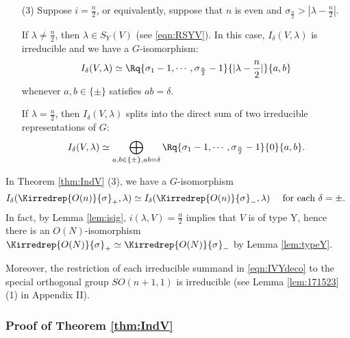 \begin{theorem}
\begin{enumerate}
\item[{\rm{(3)}}]
Suppose $i=\frac n 2$, 
 or equivalently, 
 suppose that $n$ is even and $\sigma_{\frac n 2} >|\lambda-\frac n 2|$.  



If $\lambda \ne \frac n 2$, 
then $\lambda \in S_Y(V)$
 (see \eqref{eqn:RSYV}).  
In this case,
 $I_{\delta}(V, \lambda)$ is irreducible
 and we have a $G$-isomorphism:
\[I_{\delta}(V, \lambda)
    \simeq 
\Rq{\sigma_1-1, \cdots, \sigma_{\frac n 2}-1}{|\lambda-\frac n2|}{a, b}
\]
whenever $a,b \in \{\pm\}$ satisfies $a b = \delta$.  



If $\lambda = \frac n 2$,
 then $I_{\delta}(V, \lambda)$ splits
 into the direct sum of two irreducible representations of $G$:
\begin{equation}
\label{eqn:IVYdeco}
I_{\delta}(V, \lambda)
    \simeq 
\bigoplus_{a,b \in \{\pm\}, ab =\delta}
\Rq{\sigma_1-1, \cdots, \sigma_{\frac n 2}-1}{0}{a, b}.  
\end{equation}
\end{enumerate}
\end{theorem}



\begin{remark}
\label{rem:IVlisom}
In Theorem \ref{thm:IndV} (3), 
 we have a $G$-isomorphism 
\[
   I_{\delta}({\Kirredrep{O(n)}{\sigma}}_+, \lambda)
   \simeq
   I_{\delta}({\Kirredrep{O(n)}{\sigma}}_-, \lambda)
\quad
\text{ for each $\delta= \pm$.  }
\]
In fact,
 by Lemma \ref{lem:isig}, 
 $i(\lambda,V)=\frac n 2$ implies 
 that $V$ is of type Y, 
 hence there is an $O(N)$-isomorphism
$\Kirredrep {O(N)} {\sigma}_+ \simeq \Kirredrep {O(N)} {\sigma}_-$
 by Lemma \ref{lem:typeY}.  



Moreover, 
 the restriction of each irreducible summand in \eqref{eqn:IVYdeco}
 to the special orthogonal group $SO(n+1,1)$ is irreducible
 (see Lemma \ref{lem:171523} (1) in Appendix II).  
\end{remark}


\subsubsection{Proof of Theorem \ref{thm:IndV}}

